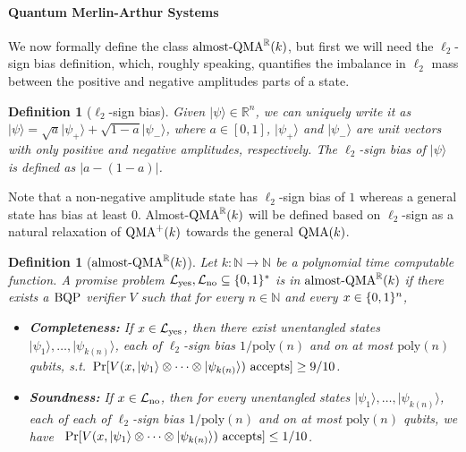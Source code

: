 \documentclass[10pt,a4paper]{article}
\newtheorem{definition}[theorem]{Definition}
\theoremstyle{remark}
\def\to{\rightarrow}
\newcommand{\R}{{\mathbb R}}
\newcommand{\abs}[1]{\ensuremath{\left\lvert #1 \right\rvert}}
\newcommand{\poly}{{\mathrm{poly}}}
\newcommand{\1}[1]{\mathds{1}{[#1]}}
\newcommand{\ket}[1]{\lvert #1\rangle}
\newcommand{\QMA}{\textup{QMA}}
\newcommand{\BQP}{\textup{BQP}}
\DeclarePairedDelimiter\set{\lbrace}{\rbrace}
\numberwithin{equation}{section}
\begin{document}

\paragraph{Quantum Merlin-Arthur Systems}
We now formally define the class $\textup{almost-QMA}^{\R}(k)$, but
first we will need the $\ell_2$-sign bias definition, which, roughly
speaking, quantifies the imbalance in $\ell_2$ mass between the
positive and negative amplitudes parts of a state.

\begin{definition}[$\ell_2$-sign bias]\label{def:ell2_sign_bias}
  Given $\ket{\psi} \in \R^n$, we can uniquely write it as $\ket{\psi}= \sqrt{a} \ket{\psi_+} + \sqrt{1-a} \ket{\psi_{-}}$,
  where $a \in [0,1]$, $\ket{\psi_{+}}$ and $\ket{\psi_{-}}$ are unit vectors with only positive and negative amplitudes, respectively.
  The $\ell_2$-sign bias of $\ket{\psi}$ is defined as $\abs{a-(1-a)}$.
\end{definition}

  Note that a non-negative amplitude state has $\ell_2$-sign bias of $1$ whereas a general
  state has bias at least $0$.
  \textup{Almost}-$\QMA^\R(k)$ will be defined based on $\ell_2$-sign as a natural relaxation of $\QMA^+(k)$ towards the general $\QMA(k)$. 


\begin{definition}[$\textup{almost-QMA}^\R(k)$]\label{def:almost_qma_k}
  Let $k \colon \mathbb{N} \to \mathbb{N}$ be a polynomial time computable function.
  A promise problem $\mathcal{L}_{\textup{yes}},\mathcal{L}_{\textup{no}} \subseteq \set{0,1}^*$ is in $\textup{almost-QMA}^\R(k)$ if there exists a $\BQP$
  verifier $V$ such that for every $n \in \mathbb{N}$ and every $x \in \set{0,1}^n$, 
  \begin{itemize}[label={}]
  \item \textbf{\textup{Completeness:}} If $x \in \mathcal{L}_{\textup{yes}}$, then there exist unentangled states $\ket{\psi_1}, \ldots, \ket{\psi_{k(n)}}$, each of $\ell_2$-sign
    bias $1/\poly(n)$ and on at most $\poly(n)$ qubits,
    s.t.\ $\Pr[V(x, \ket{\psi_1} \otimes \cdots \otimes \ket{\psi_{k(n)}})\textup{ accepts}] \ge 9/10$.
\vspace{\parsep}
    \item \textbf{\textup{Soundness:}} If $x \in \mathcal{L}_{\textup{no}}$, then for every unentangled states $\ket{\psi_1}, \ldots, \ket{\psi_{k(n)}}$, each of each of $\ell_2$-sign
    bias $1/\poly(n)$ and on at most $\poly(n)$ qubits,
    we have \ $\Pr[V(x, \ket{\psi_1} \otimes \cdots \otimes \ket{\psi_{k(n)}})\textup{ accepts}] \le 1/10$.
  \end{itemize}
\end{definition}
\end{document}
